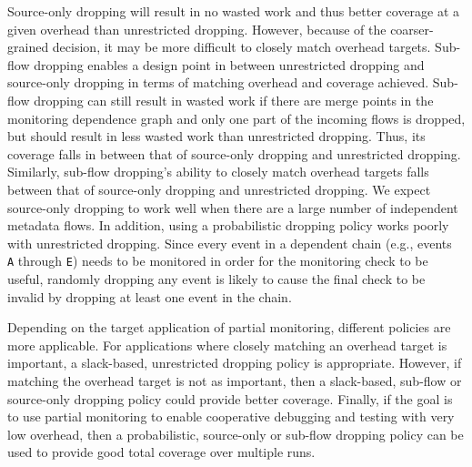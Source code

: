 Source-only dropping will
result in no wasted work and thus better coverage at a given overhead than unrestricted dropping. However, because of the coarser-grained decision, it
may be more difficult to closely match overhead targets. 
Sub-flow dropping enables a design point in between unrestricted dropping and
source-only dropping in terms of matching overhead and coverage achieved.
Sub-flow dropping can still result in wasted work if there are merge points in
the monitoring dependence graph and only one part of the incoming flows is
dropped, but should result in less wasted work than
unrestricted dropping. Thus, its coverage falls in between that of source-only
dropping and unrestricted dropping. Similarly, sub-flow dropping's ability to
closely match overhead targets falls between that of source-only dropping and
unrestricted dropping.
We expect source-only dropping 
to work well when there are a large number of independent metadata flows.
In addition, using a probabilistic dropping policy works poorly with
unrestricted dropping. Since every event in a dependent chain (e.g., events {\tt
A} through {\tt E}) needs to be monitored in order for the monitoring check to
be useful, randomly dropping any event is likely to cause the final check to be
invalid by dropping at least one event in the chain.

Depending on the target application of partial monitoring, different policies
are more applicable.
For applications where closely matching an overhead target is important, a
slack-based, unrestricted dropping policy is appropriate. However, if matching
the overhead target is not as important, then a slack-based, sub-flow or source-only dropping
policy could provide better coverage. 
Finally, if the goal is to use partial monitoring to enable cooperative
debugging and testing with very low overhead, then a probabilistic,
source-only or sub-flow dropping policy can be used to provide good total coverage over
multiple runs.

